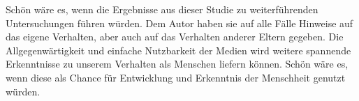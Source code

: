 Schön wäre es, wenn die Ergebnisse aus dieser Studie zu weiterführenden Untersuchungen führen würden. Dem Autor haben sie auf alle Fälle Hinweise auf das eigene Verhalten, aber auch auf das Verhalten anderer Eltern gegeben. Die Allgegenwärtigkeit und einfache Nutzbarkeit der Medien wird weitere spannende Erkenntnisse zu unserem Verhalten als Menschen liefern können. Schön wäre es, wenn diese als Chance für Entwicklung und Erkenntnis der Menschheit genutzt würden.

\newpage